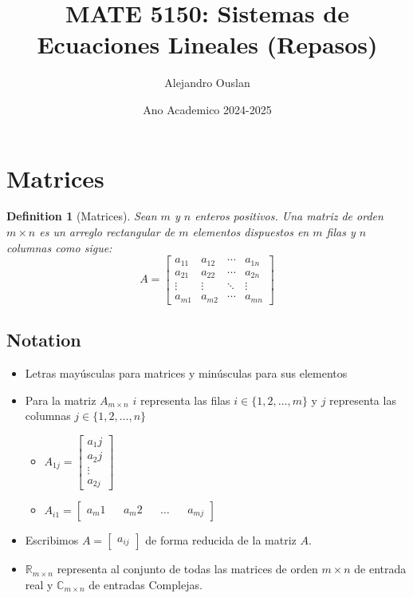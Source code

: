 \documentclass[10pt, oneside]{article}
\title{MATE 5150: Sistemas de Ecuaciones Lineales (Repasos)}
\author{Alejandro Ouslan}
\date{Ano Academico 2024-2025}
\newtheorem{defn}{Definition}
\begin{document}
\maketitle
\tableofcontents

\vspace{.25in}

\section{Matrices}

\begin{defn}[Matrices]
	Sean $m$ y $n$ enteros positivos. Una matriz de orden $m \times n$ es un arreglo rectangular de
	$m$ elementos dispuestos en $m$ filas y $n$ columnas como sigue:
	\[
		A = \begin{bmatrix}
			a_{11} & a_{12} & \cdots & a_{1n} \\
			a_{21} & a_{22} & \cdots & a_{2n} \\
			\vdots & \vdots & \ddots & \vdots \\
			a_{m1} & a_{m2} & \cdots & a_{mn}
		\end{bmatrix}
	\]
\end{defn}
\subsection{Notation}
\begin{itemize}
	\item Letras mayúsculas para matrices y minúsculas para sus elementos
	\item Para la matriz $A_{m \times n}$ $i$ representa las filas $i \in \{1,2,\ldots, m\}$ y $j$ representa
	      las columnas $j \in \{1,2,\ldots, n\}$
	      \begin{itemize}
		      \item $A_{1j} = \begin{bmatrix} a_1j \\ a_2j \\ \vdots \\ a_{2j}  \end{bmatrix}$
		      \item $A_{i1} = \begin{bmatrix} a_m1 && a_m2 && \ldots && a_{mj}  \end{bmatrix}$
	      \end{itemize}
	\item Escribimos $A = \begin{bmatrix} a_{ij} \end{bmatrix}$ de forma reducida de la matriz $A$.
	\item $\mathbb{R}_{m \times n}$ representa al conjunto de todas las matrices de orden $m \times n$ de entrada real y
	      $\mathbb{C}_{m \times n}$ de entradas Complejas.
\end{itemize}
\end{document}
